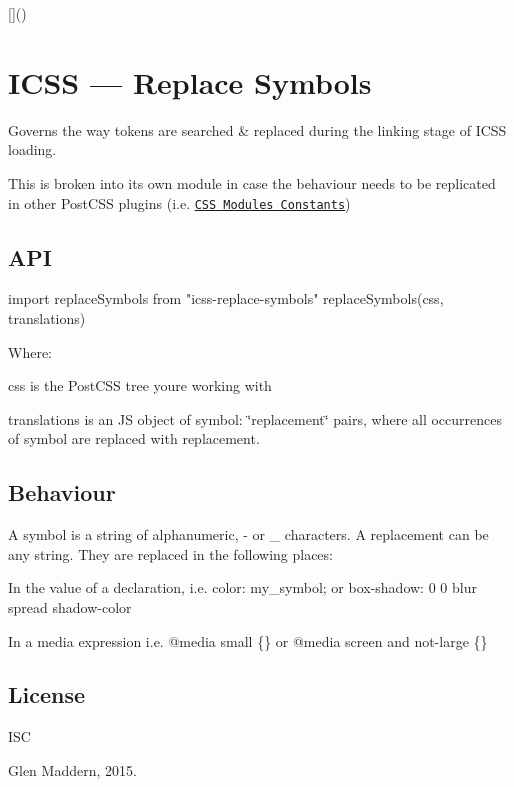 \mbox{[}\mbox{]}()

\section*{I\+C\+SS — Replace Symbols}

Governs the way tokens are searched \& replaced during the linking stage of I\+C\+SS loading.

This is broken into its own module in case the behaviour needs to be replicated in other Post\+C\+SS plugins (i.\+e. \href{https://github.com/css-modules/postcss-modules-constants}{\tt C\+SS Modules Constants})

\subsection*{A\+PI}


\begin{DoxyCode}
import replaceSymbols from "icss-replace-symbols"
replaceSymbols(css, translations)
\end{DoxyCode}


Where\+:


\begin{DoxyItemize}
\item {\ttfamily css} is the Post\+C\+SS tree you\textquotesingle{}re working with
\item {\ttfamily translations} is an JS object of {\ttfamily symbol\+: \char`\"{}replacement\char`\"{}} pairs, where all occurrences of {\ttfamily symbol} are replaced with {\ttfamily replacement}.
\end{DoxyItemize}

\subsection*{Behaviour}

A symbol is a string of alphanumeric, {\ttfamily -\/} or {\ttfamily \+\_\+} characters. A replacement can be any string. They are replaced in the following places\+:


\begin{DoxyItemize}
\item In the value of a declaration, i.\+e. {\ttfamily color\+: my\+\_\+symbol;} or {\ttfamily box-\/shadow\+: 0 0 blur spread shadow-\/color}
\item In a media expression i.\+e. {\ttfamily @media small \{\}} or {\ttfamily @media screen and not-\/large \{\}}
\end{DoxyItemize}

\subsection*{License}

I\+SC 

 Glen Maddern, 2015. 